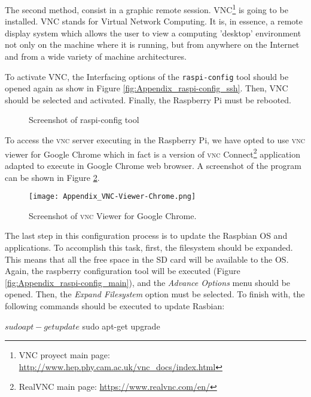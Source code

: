The second method, consist in a graphic remote session. VNC\footnote{VNC proyect main page: \url{http://www.hep.phy.cam.ac.uk/vnc_docs/index.html}} is going to be installed. VNC stands for Virtual Network Computing. It is, in essence, a remote display system which allows the user to view a computing 'desktop' environment not only on the machine where it is running, but from anywhere on the Internet and from a wide variety of machine architectures. 

To activate VNC, the Interfacing options of the \texttt{raspi-config} tool should be opened again as show in Figure \ref{fig:Appendix_raspi-config_ssh}. Then, VNC should be selected and activated. Finally, the Raspberry Pi must be rebooted.

\begin{figure}[!h]
	\centering
	\caption{Screenshot of raspi-config tool}
	\label{fig:Appendix_raspi-config}
\end{figure}

To access the \textsc{vnc} server executing in the Raspberry Pi, we have opted to use \textsc{vnc} viewer for Google Chrome which in fact is a version of \textsc{vnc} Connect\footnote{RealVNC main page: \url{https://www.realvnc.com/en/}} application adapted to execute in Google Chrome web browser. A screenshot of the program can be shown in Figure \ref{fig:Appendix_VNC-Viewer-Chrome}.

\begin{figure}[!h]
	\begin{center}
		\texttt{[image: Appendix\_VNC-Viewer-Chrome.png]}
		\caption{Screenshot of \textsc{vnc} Viewer for Google Chrome.}
		\label{fig:Appendix_VNC-Viewer-Chrome}
	\end{center}
\end{figure}

The last step in this configuration process is to update the Raspbian \acs{OS} and applications. To accomplish this task, first, the filesystem should be expanded. This means that all the free space in the SD card will be available to the \acs{OS}. Again, the raspberry configuration tool will be executed (Figure \ref{fig:Appendix_raspi-config_main}), and the \emph{Advance Options} menu should be opened. Then, the \emph{Expand Filesystem} option must be selected. To finish with, the following commands should be executed to update Rasbian:
\begin{console}
$ sudo apt-get update
$ sudo apt-get upgrade
\end{console} %


